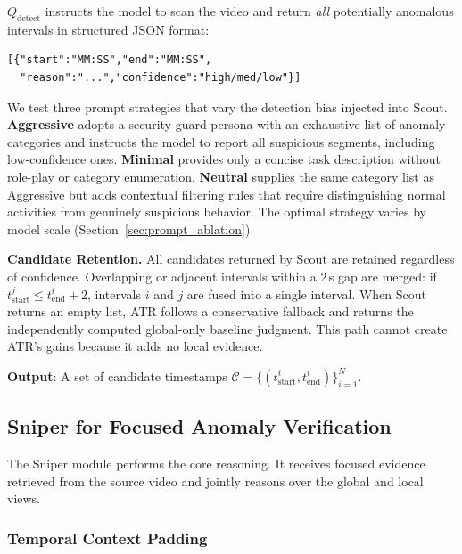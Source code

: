 $Q_{\text{detect}}$ instructs the model to scan the video and return \emph{all} potentially anomalous intervals in structured JSON format:
\begin{small}
\begin{verbatim}
[{"start":"MM:SS","end":"MM:SS",
  "reason":"...","confidence":"high/med/low"}]
\end{verbatim}
\end{small}
\noindent We test three prompt strategies that vary the detection bias injected into Scout.
\textbf{Aggressive} adopts a security-guard persona with an exhaustive list of anomaly categories and instructs the model to report all suspicious segments, including low-confidence ones.
\textbf{Minimal} provides only a concise task description without role-play or category enumeration.
\textbf{Neutral} supplies the same category list as Aggressive but adds contextual filtering rules that require distinguishing normal activities from genuinely suspicious behavior.
The optimal strategy varies by model scale (Section~\ref{sec:prompt_ablation}).

\textbf{Candidate Retention.}
All candidates returned by Scout are retained regardless of confidence.
Overlapping or adjacent intervals within a 2\,s gap are merged:
if $t_{\text{start}}^{j} \leq t_{\text{end}}^{i} + 2$, intervals $i$ and $j$ are fused into a single interval.
When Scout returns an empty list, ATR follows a conservative fallback and returns the independently computed global-only baseline judgment. This path cannot create ATR's gains because it adds no local evidence.

\textbf{Output}: A set of candidate timestamps $\mathcal{C} = \{(t_{\text{start}}^i, t_{\text{end}}^i)\}_{i=1}^N$.

\subsection{Sniper for Focused Anomaly Verification}
\label{sec:sniper}

The Sniper module performs the core reasoning. It receives focused evidence retrieved from the source video and jointly reasons over the global and local views.

\subsubsection{Temporal Context Padding}
\label{sec:ace}

